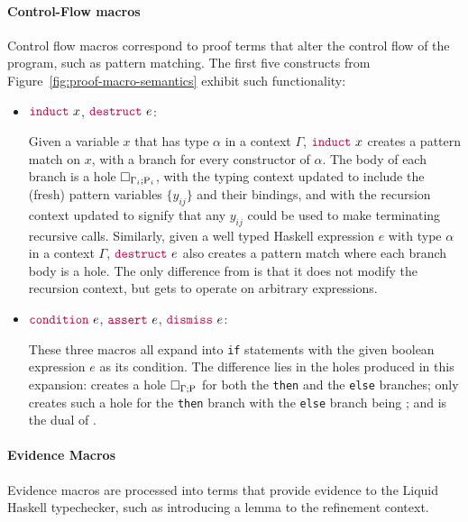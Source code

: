 \paragraph*{Control-Flow macros}

Control flow macros correspond to proof terms that alter the control
flow of the program, such as pattern matching. The first five
constructs from Figure~\ref{fig:proof-macro-semantics} exhibit such
functionality:

\begin{itemize}
\item ${\color{purple}\mathtt{induct}} ~ x$, ${\color{purple}\mathtt{destruct}} ~ e$:

  Given a variable $x$ that has type $\alpha$ in a context $\Gamma$,
  ${\color{purple}\mathtt{induct}} ~ x$ creates a pattern match on $x$, with a branch
  for every constructor of $\alpha$. The body of each branch is a hole
  $\Box_{\Gamma_i ; \mathrm{P}_i}$, with the typing context updated to
  include the (fresh) pattern variables $\{y_{ij}\}$ and their
  bindings, and with the recursion context updated to signify that any
  $y_{ij}$ could be used to make terminating recursive
  calls. Similarly, given a well typed Haskell expression $e$ with
  type $\alpha$ in a context $\Gamma$, ${\color{purple}\mathtt{destruct}} ~ e$ also
  creates a pattern match where each branch body is a hole. The only
  difference from  is that it does not modify the
  recursion context, but gets to operate on arbitrary expressions.

\item ${\color{purple}\mathtt{condition}} ~ e$, ${\color{purple}\mathtt{assert}} ~ e$, ${\color{purple}\mathtt{dismiss}} ~ e$:

  These three macros all expand into \texttt{if} statements with the
  given boolean expression $e$ as its condition. The difference lies
  in the holes produced in this expansion:  creates a
  hole $\Box_{\Gamma ; \mathrm{P}}$ for both the \texttt{then} and the
  \texttt{else} branches;  only creates such a hole for
  the \texttt{then} branch with the \texttt{else} branch being
  ; and  is the dual of .
\end{itemize}

\paragraph{Evidence Macros}

Evidence macros are processed into terms that provide evidence to the
Liquid Haskell typechecker, such as introducing a lemma to the
refinement context.

